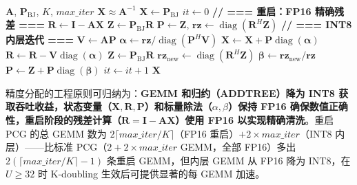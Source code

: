 \documentclass{CjC}
\begin{document}
    \begin{algorithm}[htbp] %
        \caption{重启 PCG（Restarted PCG），每条语句标注 NPU 精度}
        \label{alg:restarted-pcg}
        \begin{algorithmic}[1]
            \REQUIRE $\bm{A}$, $\bm{P}_{\text{BJ}}$, $K$, $max\_iter$
            \ENSURE $\bm{X}\approx\bm{A}^{-1}$
            \STATE $\bm{X}\leftarrow\bm{P}_{\text{BJ}}$ 
            \STATE $it\leftarrow 0$
                \STATE \textbf{// === 重启：FP16 精确残差 ===}
                \STATE $\bm{R}\leftarrow\bm{I}-\bm{A}\bm{X}$ 
                \STATE $\bm{Z}\leftarrow\bm{P}_{\text{BJ}}\bm{R}$ 
                \STATE $\bm{P}\leftarrow\bm{Z}$, $\bm{rz}\leftarrow\operatorname{diag}(\bm{R}^{H}\bm{Z})$ 
                    \STATE \textbf{// === INT8 内层迭代 ===}
                    \STATE $\bm{V}\leftarrow\bm{A}\bm{P}$ 
                    \STATE $\bm{\alpha}\leftarrow\bm{rz}/\operatorname{diag}(\bm{P}^{H}\bm{V})$ 
                    \STATE $\bm{X}\leftarrow\bm{X}+\bm{P}\operatorname{diag}(\bm{\alpha})$ 
                    \STATE $\bm{R}\leftarrow\bm{R}-\bm{V}\operatorname{diag}(\bm{\alpha})$ 
                    \STATE $\bm{Z}\leftarrow\bm{P}_{\text{BJ}}\bm{R}$ 
                    \STATE $\bm{rz}_{\text{new}}\leftarrow\operatorname{diag}(\bm{R}^{H}\bm{Z})$ 
                    \STATE $\bm{\beta}\leftarrow\bm{rz}_{\text{new}}/\bm{rz}$ 
                    \STATE $\bm{P}\leftarrow\bm{Z}+\bm{P}\operatorname{diag}(\bm{\beta})$ 
                    \STATE $it\leftarrow it+1$
                \ENDFOR
            \ENDWHILE
            \RETURN $\bm{X}$
        \end{algorithmic}
    \end{algorithm}
    
    精度分配的工程原则可归纳为：\textbf{GEMM 和归约（ADDTREE）降为 INT8 获取吞吐收益，状态变量（$\bm{X},\bm{R},\bm{P}$）和标量除法（$\alpha,\beta$）保持 FP16 确保数值正确性，重启阶段的残差计算（$\bm{R}=\bm{I}-\bm{A}\bm{X}$）使用 FP16 以实现精确清洗}。重启 PCG 的总 GEMM 数为 $2\lceil max\_iter/K\rceil$（FP16 重启）$+2\times max\_iter$（INT8 内层）——比标准 PCG（$2+2\times max\_iter$ GEMM，全部 FP16）多出 $2(\lceil max\_iter/K\rceil-1)$ 条重启 GEMM，但内层 GEMM 从 FP16 降为 INT8，在 $U\ge32$ 时 K-doubling 生效后可提供显著的每 GEMM 加速。
    
\end{document}
